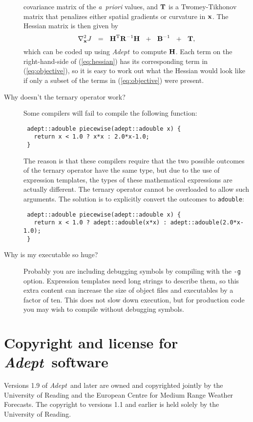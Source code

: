 \documentclass[a4,oneside]{book}
\def\codesize{\small}
\def\x{\ensuremath{{\bf x}}}
\def\Adept{\emph{Adept}}
\def\code#1{{\codesize\texttt{#1}}}
\begin{document}
\begin{description}
  covariance matrix of the \emph{a~priori} values, and ${\bf T}$ is a
  Twomey-Tikhonov matrix that penalizes either spatial gradients or
  curvature in $\x$.  The Hessian matrix is then given by
\begin{equation}
\nabla_\x^2J \myspace=\myspace {\bf H}^\mathrm{T}{\bf
  R}^{-1}{\bf H}\nonumber
\myspace+\myspace {\bf B}^{-1} \myspace+\myspace {\bf T},
\label{eq:hessian}
\end{equation}
  which can be coded up using \Adept\ to compute ${\bf H}$. Each term
  on the right-hand-side of (\ref{eq:hessian}) has its corresponding
  term in (\ref{eq:objective}), so it is easy to work out what the
  Hessian would look like if only a subset of the terms in
  (\ref{eq:objective}) were present.
\item[Why doesn't the ternary operator work?] Some compilers will fail
  to compile the following function:
\begin{lstlisting}
 adept::adouble piecewise(adept::adouble x) {
   return x < 1.0 ? x*x : 2.0*x-1.0;
 }
\end{lstlisting}%
The reason is that these compilers require that the two possible
outcomes of the ternary operator have the same type, but due to the
use of expression templates, the types of these mathematical
expressions are actually different.  The ternary operator cannot be
overloaded to allow such arguments. The solution is to explicitly
convert the outcomes to \code{adouble}:
\begin{lstlisting}
 adept::adouble piecewise(adept::adouble x) {
   return x < 1.0 ? adept::adouble(x*x) : adept::adouble(2.0*x-1.0);
 }
\end{lstlisting}
\item[Why is my executable so huge?]  Probably you are including
  debugging symbols by compiling with the \code{-g} option. Expression
  templates need long strings to describe them, so this extra content
  can increase the size of object files and executables by a factor of
  ten.  This does not slow down execution, but for production code you
  may wish to compile without debugging symbols.
\end{description}

\section{Copyright and license for \Adept\ software}
\label{sec:license}
Versions 1.9 of \Adept\ and later are owned and copyrighted jointly by
the University of Reading and the European Centre for Medium Range
Weather Forecasts. The copyright to versions 1.1 and earlier is held
solely by the University of Reading.
\end{document}
